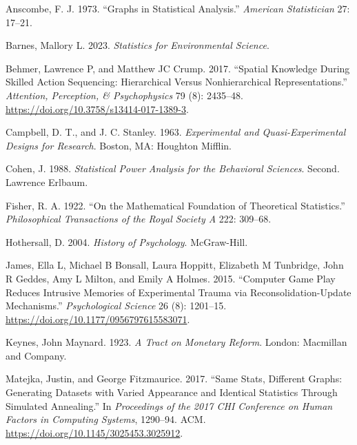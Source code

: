 \documentclass[
  letterpaper,
  DIV=11,
  numbers=noendperiod]{scrreprt}
\newlength{\cslhangindent}
\newenvironment{CSLReferences}[2] %
 {\begin{list}{}{%
  \setlength{\itemindent}{0pt}
  \setlength{\leftmargin}{0pt}
  \setlength{\parsep}{0pt}
  \ifodd #1
   \setlength{\leftmargin}{\cslhangindent}
   \setlength{\itemindent}{-1\cslhangindent}
  \fi
  \setlength{\itemsep}{#2\baselineskip}}}
 {\end{list}}
\begin{document}
\label{refs}
\begin{CSLReferences}{1}{0}
Anscombe, F. J. 1973. {``Graphs in Statistical Analysis.''}
\emph{American Statistician} 27: 17--21.

Barnes, Mallory L. 2023. \emph{Statistics for Environmental Science}.

Behmer, Lawrence P, and Matthew JC Crump. 2017. {``Spatial Knowledge
During Skilled Action Sequencing: {Hierarchical} Versus Nonhierarchical
Representations.''} \emph{Attention, Perception, \& Psychophysics} 79
(8): 2435--48. \url{https://doi.org/10.3758/s13414-017-1389-3}.

Campbell, D. T., and J. C. Stanley. 1963. \emph{Experimental and
Quasi-Experimental Designs for Research}. {Boston, MA}: {Houghton
Mifflin}.

Cohen, J. 1988. \emph{Statistical Power Analysis for the Behavioral
Sciences}. Second. {Lawrence Erlbaum}.

Fisher, R. A. 1922. {``On the Mathematical Foundation of Theoretical
Statistics.''} \emph{Philosophical Transactions of the Royal Society A}
222: 309--68.

Hothersall, D. 2004. \emph{History of Psychology}. {McGraw-Hill}.

James, Ella L, Michael B Bonsall, Laura Hoppitt, Elizabeth M Tunbridge,
John R Geddes, Amy L Milton, and Emily A Holmes. 2015. {``Computer Game
Play Reduces Intrusive Memories of Experimental Trauma via
Reconsolidation-Update Mechanisms.''} \emph{Psychological Science} 26
(8): 1201--15. \url{https://doi.org/10.1177/0956797615583071}.

Keynes, John Maynard. 1923. \emph{A Tract on Monetary Reform}. {London}:
{Macmillan and Company}.

Matejka, Justin, and George Fitzmaurice. 2017. {``Same Stats, Different
Graphs: Generating Datasets with Varied Appearance and Identical
Statistics Through Simulated Annealing.''} In \emph{Proceedings of the
2017 {CHI} Conference on Human Factors in Computing Systems}, 1290--94.
{ACM}. \url{https://doi.org/10.1145/3025453.3025912}.


\end{CSLReferences}
\end{document}
